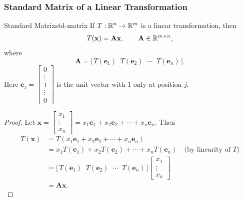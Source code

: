\subsubsection{Standard Matrix of a Linear Transformation}

\begin{theorem}{Standard Matrix}{std-matrix}
  If $T: \mathbb{R}^n \to \mathbb{R}^m$ is a linear transformation, then
  \[
    T(\mathbf{x}) = \mathbf{A}\mathbf{x}, \qquad \mathbf{A} \in \mathbb{R}^{m \times n},
  \]
  where
  \[
    \mathbf{A} = \bigl[\, T(\mathbf{e}_1) \;\; T(\mathbf{e}_2) \;\; \cdots \;\; T(\mathbf{e}_n) \,\bigr].
  \]
  Here $\mathbf{e}_j =
    \begin{bmatrix}
      0 \\ \vdots \\ 1 \\ \vdots \\ 0
    \end{bmatrix}
  $ is the unit vector with $1$ only at position $j$.
\end{theorem}

\begin{proof}
  Let $\mathbf{x} =
    \begin{bmatrix}
      x_1 \\ \vdots \\ x_n
    \end{bmatrix}
    = x_1 \mathbf{e}_1 + x_2 \mathbf{e}_2 + \cdots + x_n \mathbf{e}_n$. Then
  \begin{align*}
    T(\mathbf{x})
     & = T(x_1 \mathbf{e}_1 + x_2 \mathbf{e}_2 + \cdots + x_n \mathbf{e}_n)                      \\
     & = x_1 T(\mathbf{e}_1) + x_2 T(\mathbf{e}_2) + \cdots + x_n T(\mathbf{e}_n)
    \quad \text{(by linearity of } T\text{)}                                                     \\
     & = \bigl[\, T(\mathbf{e}_1) \;\; T(\mathbf{e}_2) \;\; \cdots \;\; T(\mathbf{e}_n) \,\bigr]
    \begin{bmatrix}
      x_1 \\ \vdots \\ x_n
    \end{bmatrix}
    \\
     & = \mathbf{A}\mathbf{x}.
  \end{align*}
\end{proof}


